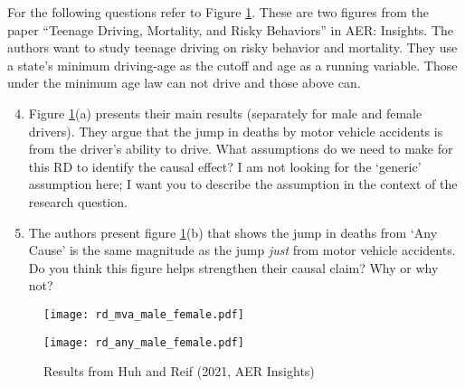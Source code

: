 \documentclass[12pt]{article}
\begin{document}
\bigskip
\noindent
For the following questions refer to Figure \ref{fig:huh_reif_2021}. 
These are two figures from the paper ``Teenage Driving, Mortality, and Risky Behaviors'' in AER: Insights. 
The authors want to study teenage driving on risky behavior and mortality. 
They use a state's minimum driving-age as the cutoff and age as a running variable. 
Those under the minimum age law can not drive and those above can. 

\medskip
\begin{enumerate}
  \setcounter{enumi}{3}
  \item Figure \ref{fig:huh_reif_2021}(a) presents their main results (separately for male and female drivers). 
  They argue that the jump in deaths by motor vehicle accidents is from the driver's ability to drive. 
  What assumptions do we need to make for this RD to identify the causal effect? 
  I am not looking for the `generic' assumption here; I want you to describe the assumption in the context of the research question.
 
  \medskip
  \item The authors present figure \ref{fig:huh_reif_2021}(b) that shows the jump in deaths from `Any Cause' is the same magnitude as the jump \emph{just} from motor vehicle accidents. 
  Do you think this figure helps strengthen their causal claim? Why or why not? 
\end{enumerate}

\medskip
\begin{figure}[htb!]
  \caption{Results from Huh and Reif (2021, AER Insights)}
  \label{fig:huh_reif_2021}
  \begin{center}
    \texttt{[image: rd\_mva\_male\_female.pdf]}
  \end{center}

  \begin{center}
    \texttt{[image: rd\_any\_male\_female.pdf]}
  \end{center}
\end{figure}
\end{document}
